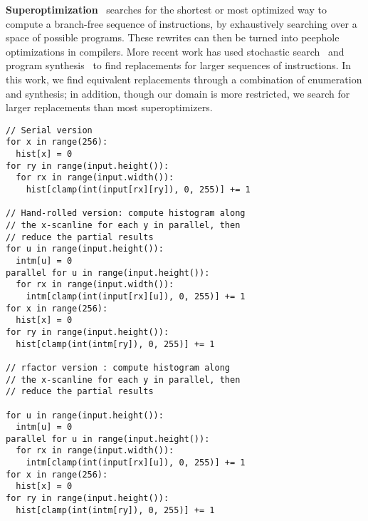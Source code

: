 \textbf{Superoptimization}~\cite{Granlund:1992:EBU:143095.143146, Massalin:1987:SLS:36206.36194} searches for the shortest or most optimized way to compute a branch-free sequence of instructions, by exhaustively searching over a space of possible programs.  These rewrites can then be turned into peephole optimizations in compilers.  More recent work has used stochastic search~\cite{Phothilimthana:2016:SUS:2872362.2872387, Schkufza:2013:SS:2490301.2451150} and program synthesis~\cite{Lopes:2015:PCP:2737924.2737965} to find replacements for larger sequences of instructions.  In this work, we find equivalent replacements through a combination of enumeration and synthesis; in addition, though our domain is more restricted, we search for larger replacements than most superoptimizers.

\begin{lstlisting}[caption={Histogram loop-ness generated by: serial version, hand-rollled parallel associative reduction version, and rfactor parallel associative reduction version}, label={lst:histogram_loopness}]
// Serial version
for x in range(256):
  hist[x] = 0
for ry in range(input.height()):
  for rx in range(input.width()):
    hist[clamp(int(input[rx][ry]), 0, 255)] += 1

// Hand-rolled version: compute histogram along 
// the x-scanline for each y in parallel, then 
// reduce the partial results
for u in range(input.height()):
  intm[u] = 0
parallel for u in range(input.height()):
  for rx in range(input.width()):
    intm[clamp(int(input[rx][u]), 0, 255)] += 1
for x in range(256):
  hist[x] = 0
for ry in range(input.height()):
  hist[clamp(int(intm[ry]), 0, 255)] += 1

// rfactor version : compute histogram along  
// the x-scanline for each y in parallel, then  
// reduce the partial results

for u in range(input.height()):
  intm[u] = 0
parallel for u in range(input.height()):
  for rx in range(input.width()):
    intm[clamp(int(input[rx][u]), 0, 255)] += 1
for x in range(256):
  hist[x] = 0
for ry in range(input.height()):
  hist[clamp(int(intm[ry]), 0, 255)] += 1
\end{lstlisting}

